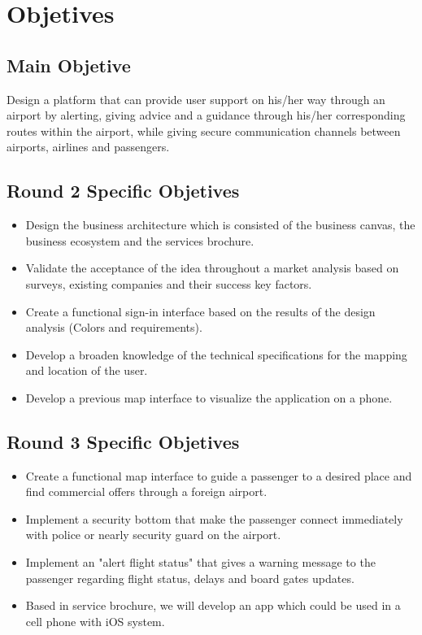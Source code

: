 \documentclass[12pt]{article}
\begin{document}
\section{Objetives}

\subsection{Main Objetive}

Design a platform that can provide user support on his/her way through an airport by alerting, giving advice and a guidance through his/her corresponding routes within the airport, while giving secure communication channels between airports, airlines and passengers.\\
[0.7cm]

\subsection{Round 2 Specific Objetives}
\begin{itemize}
	\item Design the business architecture which is consisted of the business canvas, the business ecosystem and the services brochure.
	\item Validate the acceptance of the idea throughout a market analysis based on surveys, existing companies and their success key factors.
	\item Create a functional sign-in interface based on the results of the design analysis (Colors and requirements). 
	\item Develop a broaden knowledge of the technical specifications for the mapping and location of the user.
	\item Develop a previous map interface to visualize the application on a phone.\\
[0.7cm]
\end{itemize}

\subsection{Round 3 Specific Objetives}
\begin{itemize}
	\item Create a functional map interface to guide a passenger to a desired place and find commercial offers through a foreign airport.
	\item Implement a security bottom that make the passenger connect immediately with police or nearly security guard on the airport.
	\item Implement an "alert flight status" that gives a warning message to the passenger regarding flight status, delays and board gates updates. 
	\item Based in service brochure, we will develop an app which could be used in a cell phone with iOS system.\\
[0.6cm]
\end{itemize}
\end{document}

